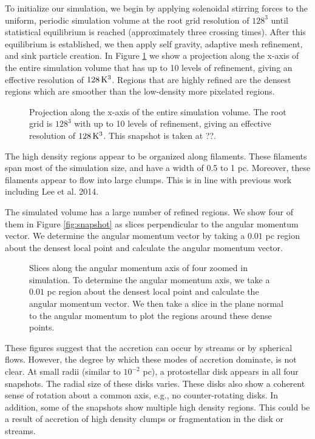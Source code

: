 \documentclass{emulateapj}
\begin{document}
To initialize our simulation, we begin by applying solenoidal stirring forces to the uniform, periodic simulation volume at the root grid resolution of $128^3$ until statistical equilibrium is reached (approximately three crossing times).  After this equilibrium is established, we then apply self gravity, adaptive mesh refinement, and sink particle creation.  In Figure \ref{fig:entire projection} we show a projection along the x-axis of the entire simulation volume that has up to 10 levels of refinement, giving an effective resolution of $128\,{\rm K}^3$. Regions that are highly refined are the densest regions which are smoother than the low-density more pixelated regions.
\begin{figure}
\caption{Projection along the x-axis of the entire simulation volume. The root grid is $128^3$ with up to 10 levels of refinement, giving an effective resolution of $128\,{\rm K}^3$. This snapshot is taken at ??. \label{fig:entire projection}}
\end{figure}

The high density regions appear to be organized along filaments.  These filaments span most of the simulation size, and have a width of 0.5 to 1 pc.  Moreover, these filaments appear to flow into large clumps.  This is in line with previous work including Lee et al. 2014.  

The simulated volume has a large number of refined regions.  We show four of them in Figure \ref{fig:snapshot} as slices perpendicular to the angular momentum vector.  We determine the angular momentum vector by taking a $0.01$ pc region about the densest local point and calculate the angular momentum vector.  

\begin{figure*}
\caption{Slices along the angular momentum axis of four zoomed in simulation. To determine the angular momentum axis, we take a $0.01$ pc region about the densest local point and calculate the angular momentum vector. We then take a slice in the plane normal to the angular momentum to plot the regions around these dense points. \label{fig:snapshots}}
\end{figure*}


These figures suggest that the accretion can occur by streams or by spherical flows.  However, the degree by which these modes of accretion dominate, is not clear.  At small radii (similar to $10^{-2}$ pc), a protostellar disk appears in all four snapshots. The radial size of these disks varies. These disks also show a coherent sense of rotation about a common axis, e.g., no counter-rotating disks. In addition, some of the snapshots show multiple high density regions.  This could be a result of accretion of high density clumps or fragmentation in the disk or streams.   
\end{document}

